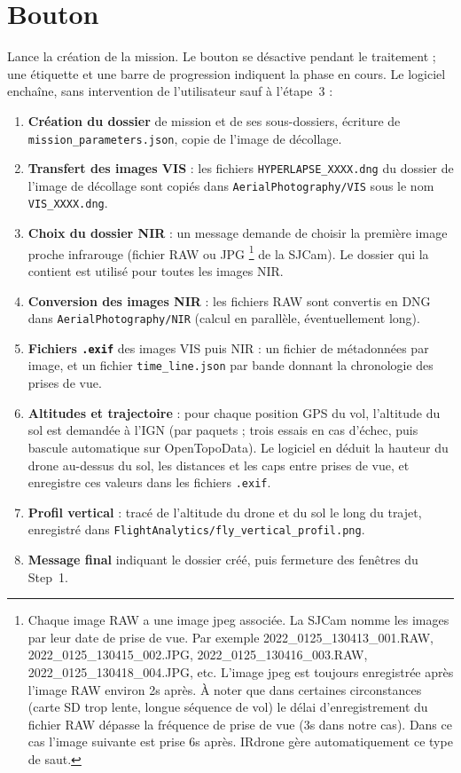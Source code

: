 \documentclass[a4paper,11pt]{report}
\DeclareRobustCommand{\bouton}[1]{\texorpdfstring{\fbox{\small\textsf{#1}}}{#1}}
\begin{document}
\section{Bouton \bouton{Create the mission}}\label{btn:step1_validate}
Lance la cr\'eation de la mission. Le bouton se d\'esactive pendant le traitement ; une \'etiquette et une barre de progression
indiquent la phase en cours. Le logiciel encha\^ine, sans intervention de l'utilisateur sauf \`a l'\'etape~3 :
\begin{enumerate}
  \item \textbf{Cr\'eation du dossier} de mission et de ses sous-dossiers, \'ecriture de \texttt{mission\_parameters.json},
        copie de l'image de d\'ecollage.
  \item \textbf{Transfert des images VIS} : les fichiers \texttt{HYPERLAPSE\_XXXX.dng} du dossier de l'image de d\'ecollage sont copi\'es
        dans \texttt{AerialPhotography/VIS} sous le nom \texttt{VIS\_XXXX.dng}.
  \item \textbf{Choix du dossier NIR} : un message demande de choisir la premi\`ere image proche infrarouge (fichier RAW ou JPG
  \footnote{Chaque image RAW a une image jpeg associée. La SJCam nomme les images par leur date de prise de vue. Par exemple 2022\_0125\_130413\_001.RAW, 2022\_0125\_130415\_002.JPG, 2022\_0125\_130416\_003.RAW, 2022\_0125\_130418\_004.JPG, etc. L'image jpeg est toujours enregistrée après l'image RAW environ 2s après. À noter que dans certaines circonstances (carte SD trop lente, longue séquence de vol) le délai d'enregistrement du fichier RAW dépasse la fréquence de prise de vue (3s dans notre cas). Dans ce cas l'image suivante est prise 6s après. IRdrone gère automatiquement ce type de saut.} de la SJCam).
        Le dossier qui la contient est utilis\'e pour toutes les images NIR.
  \item \textbf{Conversion des images NIR} : les fichiers RAW sont convertis en DNG dans \texttt{AerialPhotography/NIR}
        (calcul en parall\`ele, \'eventuellement long).
  \item \textbf{Fichiers \texttt{.exif}} des images VIS puis NIR : un fichier de m\'etadonn\'ees par image,
        et un fichier \texttt{time\_line.json} par bande donnant la chronologie des prises de vue.
  \item \textbf{Altitudes et trajectoire} : pour chaque position GPS du vol, l'altitude du sol est demand\'ee \`a l'IGN (par paquets ;
        trois essais en cas d'\'echec, puis bascule automatique sur OpenTopoData). Le logiciel en d\'eduit la hauteur du drone au-dessus du sol,
        les distances et les caps entre prises de vue, et enregistre ces valeurs dans les fichiers \texttt{.exif}.
  \item \textbf{Profil vertical} : trac\'e de l'altitude du drone et du sol le long du trajet, enregistr\'e dans
        \texttt{FlightAnalytics/fly\_vertical\_profil.png}.
  \item \textbf{Message final} indiquant le dossier cr\'e\'e, puis fermeture des fen\^etres du Step~1.
\end{enumerate}
\end{document}
